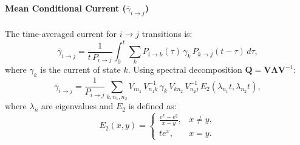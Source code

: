 \documentclass[pdflatex,sn-nature]{sn-jnl}%
\begin{document}
\paragraph{Mean Conditional Current (\(\overline{\gamma}_{i \rightarrow j}\))}
The time-averaged current for \(i \rightarrow j\) transitions is:
\begin{equation}
    \overline{\gamma}_{i \rightarrow j} = \frac{1}{t\,P_{i\rightarrow j}} \int_0^t \sum_k P_{i\rightarrow k}(\tau)\,\gamma_k\,P_{k\rightarrow j}(t-\tau)\,d\tau,
    \label{eq:gamma_ij_integral_short}
\end{equation}
where \(\gamma_k\) is the current of state \(k\). Using spectral decomposition \(\mathbf{Q} = \mathbf{V} \boldsymbol{\Lambda} \mathbf{V}^{-1}\):
\begin{equation}
    \overline{\gamma}_{i \rightarrow j} = \frac{1}{P_{i\rightarrow j}} \sum_{k, n_1, n_2} V_{i n_1}\,V^{-1}_{n_1 k}\,\gamma_k\,V_{k n_2}\,V^{-1}_{n_2 j}\,E_2(\lambda_{n_1}t,\lambda_{n_2}t),
    \label{eq:gamma_ij_formula_short}
\end{equation}
where \(\lambda_n\) are eigenvalues and \(E_2\) is defined as:
\begin{equation}
    E_2(x,y)=
    \begin{cases}
        \frac{e^x-e^y}{x-y}, & x\neq y, \\
        t e^x, & x=y. %
    \end{cases}
    \label{eq:E2_short} %
\end{equation}
\end{document}
